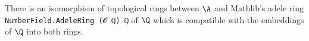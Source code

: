 There is an isomorphism of topological rings between $\A$ and Mathlib's adele ring
\texttt{NumberField.AdeleRing (𝓞 ℚ) ℚ} of $\Q$ which is compatible with the embeddings of $\Q$ into both rings.
